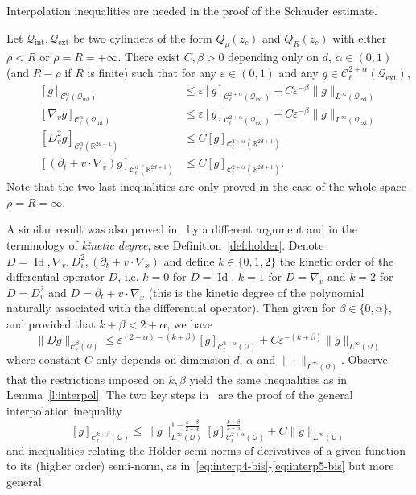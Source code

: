 \documentclass[AHL,Unicode,longabstracts,published]{cedram}
\newcommand{\R}{\mathbb{R}}
\newcommand{\cC}{\mathcal{C}}
\newcommand{\cQ}{\mathcal{Q}}
\newcommand{\Qext}{\cQ_{\mathrm{ext}}}
\newcommand{\Qint}{\cQ_{\mathrm{int}}}
\DeclareMathOperator{\Id}{Id}
\newcommand*\eps{\varepsilon}
\begin{document}
Interpolation inequalities are needed in the proof of the Schauder estimate.

\begin{lemm}\label{l:interpol}
Let $\Qint, \Qext$ be two cylinders of the form $Q_\rho(z_c)$ and $Q_R(z_c)$ with either $\rho < R$ or $\rho = R = +\infty$. There exist $C,\beta>0$ depending only on $d$, $\alpha \in (0,1)$ (and $R-\rho$ if $R$ is finite) such that for any $\eps \in (0,1)$ and any $g \in \cC_\ell^{2+\alpha}(\Qext)$,
\begin{align}\label{eq:interp1}
[g]_{\cC^\alpha_\ell (\Qint)} & \le \eps [g]_{\cC_\ell^{2+\alpha}(\Qext)} + C \eps^{-\beta} \|g\|_{L^\infty(\Qext)} \\\label{eq:interp3}
\left[\nabla_v g\right]_{\cC_\ell^{\alpha}(\Qint)} & \le \eps [g]_{\cC_\ell^{2+\alpha} (\Qext)} + C\eps^{-\beta} \|g\|_{L^\infty (\Qext)}\\\label{eq:interp4-bis}
\left[D^2 _v g\right]_{\cC_\ell^\alpha\left(\R^{2d+1}\right)} & \le C [g]_{\cC_\ell^{2+\alpha}\left(\R^{2d+1}\right)} \\\label{eq:interp5-bis}
\left[\left(\partial_t + v \cdot \nabla_v\right) g\right]_{\cC_\ell^\alpha\left(\R^{2d+1}\right)} & \le C [g]_{\cC_\ell^{2+\alpha}\left(\R^{2d+1}\right)}.
\end{align}
Note that the two last inequalities are only proved in the case of the whole space $\rho=R=\infty$.
\end{lemm}


\begin{rema}
A similar result was also proved in~\cite[Lemma~2.7]{imbert2018schauder} by a different argument and in the terminology of \emph{kinetic degree}, see Definition~\ref{def:holder}. Denote $D=\Id,\nabla_v, D^2_v,(\partial_t + v \cdot \nabla_x)$ and define $k \in \{0,1,2\}$ the kinetic order of the differential operator $D$, i.e. $k=0$ for $D=\Id$, $k=1$ for $D = \nabla_v$ and $k=2$ for $D=D^2_v$ and $D=\partial_t + v \cdot \nabla_x$ (this is the kinetic degree of the polynomial naturally associated with the differential operator). Then given for $\beta \in \{0,\alpha\}$, and provided that $k+\beta < 2+\alpha$, we have
\begin{equation}\label{e:interpol-cyril}
\|Dg\|_{\cC_\ell^\beta(\cQ)} \le \eps^{(2+\alpha)-(k+\beta)} [g]_{\cC_\ell^{2+\alpha}(\cQ)} + C\eps^{-(k+\beta)} \|g\|_{L^\infty(\cQ)}
\end{equation}
where constant $C$ only depends on dimension $d$, $\alpha$ and $\|\cdot\|_{L^\infty(\cQ)}$. Observe that the restrictions imposed on $k,\beta$ yield the same inequalities as in Lemma~\ref{l:interpol}. The two key steps in~\cite[Lemma~2.7]{imbert2018schauder} are the proof of the general interpolation inequality
\[
[g]_{\cC_\ell^{k+\beta}(\cQ)} \le
\|g\|_{L^\infty(\cQ)}^{1-\frac{k+\beta}{2+\alpha}} [g]_{\cC_\ell^{2+\alpha}(\cQ)}^{\frac{k+\beta}{2+\alpha}} + C
\|g\|_{L^\infty(\cQ)}
\]
and inequalities relating the H\"older semi-norms of derivatives of a given function to its (higher order) semi-norm, as in~\eqref{eq:interp4-bis}-\eqref{eq:interp5-bis} but more general.
\end{rema}
\end{document}
